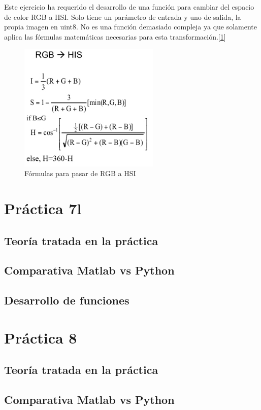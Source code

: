 \documentclass[a4paper,12pt]{report}
\begin{document}
Este ejercicio ha requerido el desarrollo de una función para cambiar del espacio de color RGB a HSI. Solo tiene un parámetro de entrada y uno de salida, la propia imagen en uint8. No es una función demasiado compleja ya que solamente aplica las fórmulas matemáticas necesarias para esta transformación.[\ref{rgb2hsi}]

\begin{figure}[h]
\centering
\includegraphics[width=0.6\textwidth]{imagenes/rgb2hsi}
\caption{Fórmulas para pasar de RGB a HSI}
\label{rgb2hsi} 
\end{figure}

\section{ Práctica 7l}
\subsection{Teoría tratada en la práctica}
\subsection{Comparativa Matlab vs Python}
\subsection{Desarrollo de funciones}


\section{ Práctica 8}
\subsection{Teoría tratada en la práctica}
\subsection{Comparativa Matlab vs Python}
\end{document}
